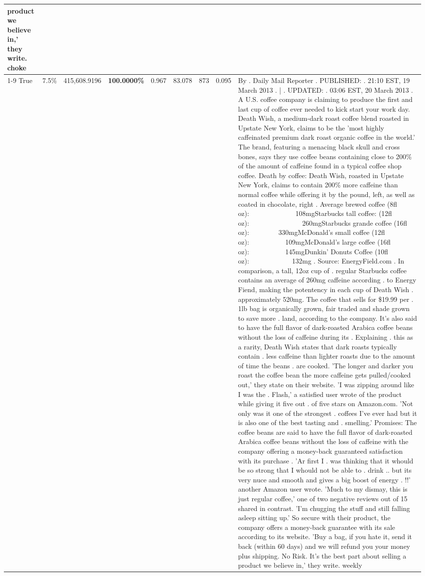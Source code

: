 \begin{table}[H]
{\begin{tabular}{lllrlllll}
product we believe in,' they write. choke \\
\cline{1-9} \cline{2-9}
True & 7.5\% & 415,608.9196 & \bfseries \color{red} 100.0000\% & 0.967 & 83.078 & 873 & 0.095 & By . Daily Mail Reporter . PUBLISHED: . 21:10 EST, 19 March 2013 . | . UPDATED: . 03:06 EST, 20 March 2013 . A U.S. coffee company is claiming to produce the first and last cup of coffee ever needed to kick start your work day. Death Wish, a medium-dark roast coffee blend roasted in Upstate New York, claims to be the 'most highly caffeinated premium dark roast organic coffee in the world.' The brand, featuring a menacing black skull and cross bones, says they use coffee beans containing close to 200\% of the amount of caffeine found in a typical coffee shop coffee. Death by coffee: Death Wish, roasted in Upstate New York, claims to contain 200\% more caffeine than normal coffee while offering it by the pound, left, as well as coated in chocolate, right . Average brewed coffee (8fl oz):              108mgStarbucks tall coffee: (12fl oz):                260mgStarbucks grande coffee (16fl oz):         330mgMcDonald's small coffee (12fl oz):           109mgMcDonald's large coffee (16fl oz):           145mgDunkin' Donuts Coffee (10fl oz):             132mg . Source: EnergyField.com . In comparison, a tall, 12oz cup of . regular Starbucks coffee contains an average of 260mg caffeine according . to Energy Fiend, making the potentency in each cup of Death Wish . approximately 520mg. The coffee that sells for \$19.99 per . 1lb bag is organically grown, fair traded and shade grown to save more . land, according to the company. It's also said to have the full flavor of dark-roasted Arabica coffee beans without the loss of caffeine during its . Explaining . this as a rarity, Death Wish states that dark roasts typically contain . less caffeine than lighter roasts due to the amount of time the beans . are cooked. 'The longer and darker you roast the coffee bean the more caffeine gets pulled/cooked out,' they state on their website. 'I was zipping around like I was the . Flash,' a satisfied user wrote of the product while giving it five out . of five stars on Amazon.com. 'Not only was it one of the strongest . coffees I've ever had but it is also one of the best tasting and . smelling.’ Promises: The coffee beans are said to have the full flavor of dark-roasted Arabica coffee beans without the loss of caffeine with the company offering a money-back guaranteed satisfaction with its purchase . 'Ar first I . was thinking that it whould be so strong that I whould not be able to . drink .. but its very nuce and smooth and gives a big boost of energy . !!' another Amazon user wrote. 'Much to my dismay, this is just regular coffee,' one of two negative reviews out of 15 shared in contrast. 'I'm chugging the stuff and still falling asleep sitting up.' So secure with their product, the company offers a money-back guarantee with its sale according to its website. 'Buy a bag, if you hate it, send it back (within 60 days) and we will refund you your money plus shipping. No Risk. It’s the best part about selling a product we believe in,' they write. weekly \\

\end{tabular}}
\end{table}
